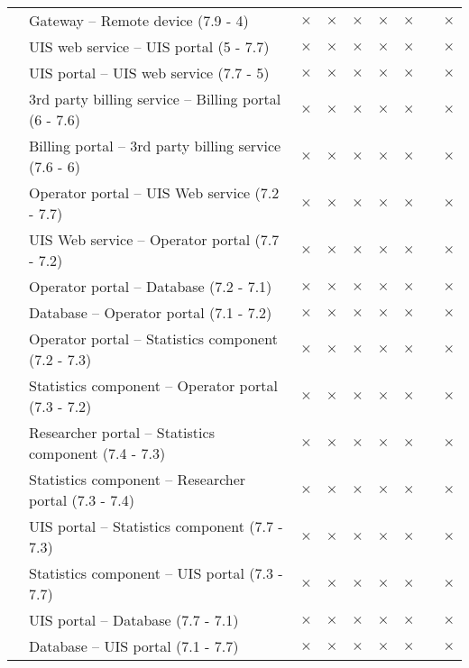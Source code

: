 \begin{longtable}{p{2.3cm} p{9cm} p{0.2cm} p{0.2cm} p{0.2cm} p{0.2cm}p{0.2cm} p{0.2cm} p{0.2cm} }
		   &  Gateway -- Remote device (7.9 - 4) & $\times$ & $\times$ & $\times$& $\times$ &  $\times$ & & $\times$\\
		   &  UIS web service -- UIS portal (5 - 7.7) & $\times$ & $\times$ & $\times$& $\times$ &  $\times$ & & $\times$\\
		   &  UIS portal -- UIS web service (7.7 - 5) & $\times$ & $\times$ & $\times$& $\times$ &  $\times$ & & $\times$\\
		   &  3rd party billing service -- Billing portal (6 - 7.6) & $\times$ & $\times$ & $\times$& $\times$ &  $\times$ & & $\times$\\
		   & Billing portal --  3rd party billing service (7.6 - 6) & $\times$ & $\times$ & $\times$& $\times$ &  $\times$ & & $\times$\\
		   &  Operator portal  -- UIS Web service (7.2 - 7.7) & $\times$ & $\times$ & $\times$& $\times$ &  $\times$ & & $\times$\\
		   &  UIS Web service -- Operator portal (7.7 - 7.2) & $\times$ & $\times$ & $\times$& $\times$ &  $\times$ & & $\times$\\
		   &  Operator portal -- Database (7.2 - 7.1) & $\times$ & $\times$ & $\times$& $\times$ &  $\times$ & & $\times$\\
		   &  Database -- Operator portal (7.1 - 7.2) & $\times$ & $\times$ & $\times$& $\times$ &  $\times$ & & $\times$\\
		   &  Operator portal -- Statistics component (7.2 - 7.3) & $\times$ & $\times$ & $\times$& $\times$ &  $\times$ & & $\times$\\
		   &  Statistics component -- Operator portal (7.3 - 7.2) & $\times$ & $\times$ & $\times$& $\times$ &  $\times$ & & $\times$\\
		   &  Researcher portal -- Statistics component (7.4 - 7.3) & $\times$ & $\times$ & $\times$& $\times$ &  $\times$ & & $\times$\\
		   &  Statistics component -- Researcher portal (7.3 - 7.4) & $\times$ & $\times$ & $\times$& $\times$ &  $\times$ & & $\times$\\
		   &  UIS portal -- Statistics component (7.7 - 7.3) & $\times$ & $\times$ & $\times$& $\times$ &  $\times$ & & $\times$\\
		   &  Statistics component -- UIS portal (7.3 - 7.7) & $\times$ & $\times$ & $\times$& $\times$ &  $\times$ & & $\times$\\
		   &  UIS portal -- Database (7.7 - 7.1) & $\times$ & $\times$ & $\times$& $\times$ &  $\times$ & & $\times$\\
		   &  Database -- UIS portal (7.1 - 7.7) & $\times$ & $\times$ & $\times$& $\times$ &  $\times$ & & $\times$\\
		   

\end{longtable}
